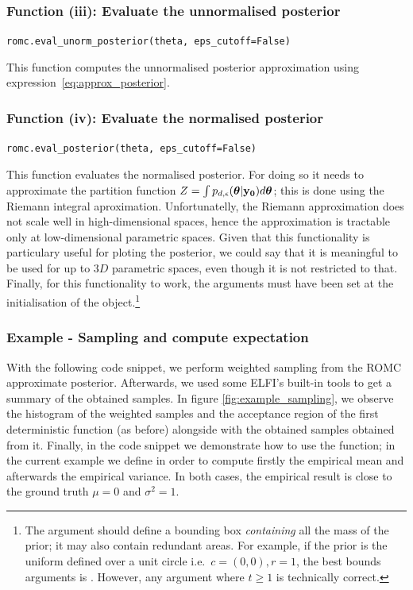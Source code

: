 \subsubsection*{Function (iii): Evaluate the unnormalised posterior}
\texttt{romc.eval_unorm_posterior(theta, eps_cutoff=False)}
\vspace{5mm}

\noindent
This function computes the unnormalised posterior approximation using
expression~\eqref{eq:approx_posterior}.

\subsubsection*{Function (iv): Evaluate the normalised posterior}
\texttt{romc.eval_posterior(theta, eps_cutoff=False)}
\vspace{5mm}

\noindent
This function evaluates the normalised posterior. For doing so it
needs to approximate the partition function
$Z = \int p_{d,\epsilon}(\boldsymbol{\theta}|\mathbf{y_0})d\boldsymbol{\theta}$; this is done using
the Riemann integral aproximation. Unfortunatelly, the Riemann
approximation does not scale well in high-dimensional spaces, hence
the approximation is tractable only at low-dimensional parametric
spaces. Given that this functionality is particulary useful for
ploting the posterior, we could say that it is meaningful to be used
for up to $3D$ parametric spaces, even though it is not restricted to
that. Finally, for this functionality to work, the 
arguments must have been set at the initialisation of the
 object.\footnote{The argument 
  should define a bounding box \emph{containing} all the mass of the
  prior; it may also contain redundant areas. For example, if the
  prior is the uniform defined over a unit circle i.e.\
  $c=(0,0), r=1$, the best bounds arguments is
  . However, any argument
   where $t\geq1$ is technically
  correct.}

\subsubsection*{Example - Sampling and compute expectation}

With the following code snippet, we perform weighted sampling from the
ROMC approximate posterior. Afterwards, we used some ELFI's built-in
tools to get a summary of the obtained samples. In figure
\ref{fig:example_sampling}, we observe the histogram of the weighted
samples and the acceptance region of the first deterministic function
(as before) alongside with the obtained samples obtained from
it. Finally, in the code snippet we demonstrate how to use the
 function; in the current example we
define \pinline{h} in order to compute firstly the empirical mean and
afterwards the empirical variance. In both cases, the empirical result
is close to the ground truth $\mu = 0$ and $\sigma^2 = 1$.

